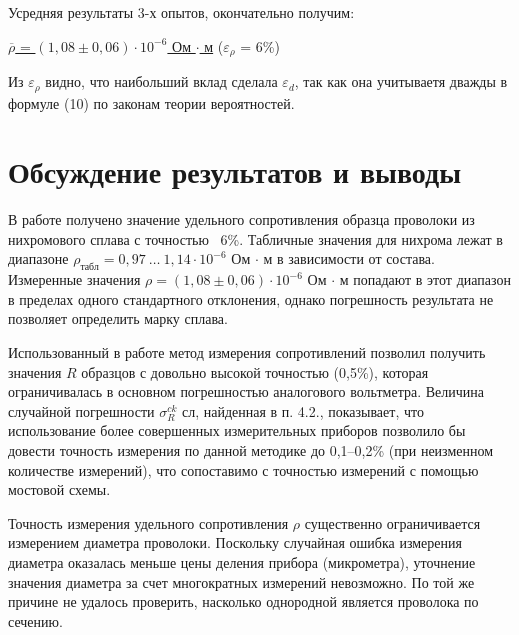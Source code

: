 \documentclass[12pt,a4paper]{article}
\begin{document}
Усредняя результаты 3-х опытов, окончательно получим:

{\centering \underline{$\overline{\rho}$ = $(1,08 \pm 0,06)\cdot 10^{-6}$ Ом $\cdot$ м} ($\varepsilon_{\rho}$ = 6\%)}

Из $\varepsilon_{\rho}$ видно, что наибольший вклад сделала $\varepsilon_{d}$, так как она учитываетя дважды в формуле (10) по законам теории вероятностей.
\newpage

\section{ Обсуждение результатов и выводы}
В работе получено значение удельного сопротивления образца проволоки из нихромового
сплава с точностью ~6\%. Табличные значения для нихрома лежат в диапазоне
$\rho_{табл} = 0,97~\ldots~1,14 \cdot 10^{-6}$ Ом $\cdot$ м  в зависимости от состава. Измеренные значения
$\rho = (1,08 \pm 0,06) \cdot 10^{-6}$ Ом $\cdot$ м попадают в этот диапазон в пределах одного стандартного отклонения, однако погрешность результата не позволяет определить марку сплава.

Использованный в работе метод измерения сопротивлений позволил получить значения $R$
образцов с довольно высокой точностью (0,5\%), которая ограничивалась в основном погрешностью аналогового вольтметра. Величина случайной погрешности $\sigma ^{ck} _{R}$
сл, найденная в п. 4.2., показывает, что использование более совершенных измерительных приборов позволило бы довести точность измерения по данной методике до 0,1–0,2\% (при неизменном количестве измерений), что сопоставимо с точностью измерений с помощью мостовой схемы.

Точность измерения удельного сопротивления $\rho$ существенно ограничивается измерением
диаметра проволоки. Поскольку случайная ошибка измерения диаметра оказалась меньше
цены деления прибора (микрометра), уточнение значения диаметра за счет многократных измерений невозможно. По той же причине не удалось проверить, насколько однородной является проволока по сечению.
\end{document}
